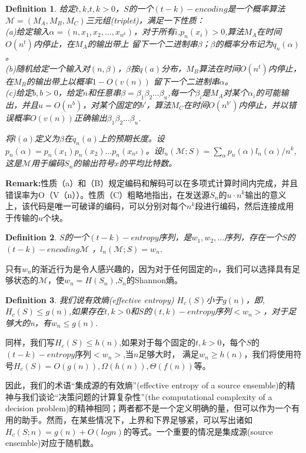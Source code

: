 \documentclass[]{article}
\newtheorem{definition}{Definition}
\begin{document}
\begin{definition}
	给定$t,k$,$t,k>0$，$S$的一个$(t-k)-encoding$是一个概率算法$\mathcal{M}=(M_A,M_B,M_C)$三元组(triplet)，满足一下性质：\\
	(a)给定输入$\alpha=(n,x_1,x_2,\ldots,x_{n^k})$，对于所有$i$,$p_n(x_i)>0$,算法$M_A$在时间$O(n^t)$内停止，在$M_A$的输出带上
	留下一个二进制串$\beta$；$\beta$的概率分布记为$q_n(\alpha)$。\\
	(b)随机给定一个输入对$(n,\beta)$，$\beta$按$q(a)$分布，$M_B$算法在时间$O(n^t)$内停止，在$M_B$的输出带上以概率$1-O(v(n))$
	留下一个二进制串$\alpha$。\\
	(c)给定$b,b>0$，给定$n$和任意串$\beta=\beta_1\beta_2\ldots\beta_u$,每一个$\beta_i$是$M_A$对某个$\alpha_i$的可能输出，并且$u=O(n^b)$，对某个固定的$b'$，算法$M_C$在时间$O(n^{b'})$内停止，并以错误概率$O(v(n))$正确输出$\beta_1\beta_2\ldots\beta_u$.\par
	将$l(a)$定义为$\beta$在$q_n(a)$上的预期长度。设$p_n(\alpha)=p_n(x_1)p_n(x_2)\ldots p_n(x_{n^k}) $。设$l_n(\mathcal{M};S)=\sum_{\alpha}p_n(\alpha)l_n(\alpha)/n^k$,这是$\mathcal{M}$用于编码$S_n$的输出符号$x$的平均比特数。
\end{definition}

\textbf{Remark:}\hspace{0.5cm}性质（a）和（B）规定编码和解码可以在多项式计算时间内完成，并且错误率为O（V（n））。性质（C）粗略地指出，在发送源$S_n$的$u\cdot n^k$输出的意义上，该代码是唯一可破译的编码，可以分别对每个$n^k$段进行编码，然后连接成用于传输的$u$个块。


\begin{definition}
	$S$的一个$(t-k)-entropy$序列，是$w_1,w_2,\ldots$序列，存在一个$S$的$(t-k)-encoding \mathcal{M}$ ，$l_n(\mathcal{M};S)=w_n$.
\end{definition}


只有$w_n$的渐近行为是令人感兴趣的，因为对于任何固定的$n$，我们可以选择具有足够状态的$\mathcal{M}$，使$w_n=H(S_n)$,$S_n$的Shannon熵。


\begin{definition}
	我们说有效熵(effective entropy) $H_c(S)$小于$g(n)$，即,$H_c(S)\leq g(n)$,如果存在$t,k>0$和$S$的$(t,k)-entropy$序列$<w_n>$，对于足够大的n，有$w_n\leq g(n)$.
\end{definition}

同样，我们写$H_c(S)\leq h(n)$,如果对于每个固定的$t,k>0$，每个$S$的$(t-k)-entropy$序列$<w_n>$,当$n$足够大时，
满足$w_n\geq h(n)$，我们将使用符号$H_c(S)=O(g(n)),\Omega(h(n)),\Theta(f(n))$等。


因此，我们的术语“集成源的有效熵”(effective entropy of a source ensemble)的精神与我们谈论“决策问题的计算复杂性”(the computational complexity of a decision problem)的精神相同；两者都不是一个定义明确的量，但可以作为一个有用的助手。然而，在某些情况下，上界和下界足够紧，可以写出诸如$H_c(S;n)=g(n)+O(logn)$的等式。一个重要的情况是集成源(source ensemble)对应于随机数。
\end{document}
